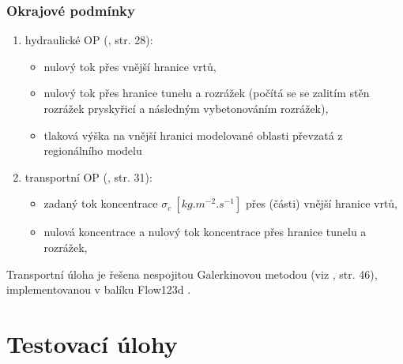 \documentclass[11pt,a4paper]{article}
\newcommand{\jb}[1]{{\color{violet} JB: #1}}
\begin{document}
\begin{onehalfspacing}

\subsubsection{Okrajové podmínky}
     \begin{enumerate}
        \item hydraulické OP (\cite{flow_pdf_manual}, str. 28):
            \begin{itemize}
                \item nulový tok přes vnější hranice vrtů,
                \item nulový tok přes hranice tunelu a rozrážek (počítá se se zalitím stěn rozrážek pryskyřicí a následným vybetonováním rozrážek),
                \item tlaková výška na vnější hranici modelované oblasti převzatá z regionálního modelu
            \end{itemize}
        \item transportní OP (\cite{flow_pdf_manual}, str. 31):
            \begin{itemize}
                \item zadaný tok koncentrace $\sigma_c~[kg.m^{-2}.s^{-1}]$ přes (části) vnější hranice vrtů,
                \item nulová koncentrace a nulový tok koncentrace přes hranice tunelu a rozrážek,
            \end{itemize}
     \end{enumerate}
     
Transportní úloha je řešena nespojitou Galerkinovou metodou (viz \cite{flow_pdf_manual}, str. 46), implementovanou v balíku Flow123d \cite{flow123d}.



\newpage
\section{Testovací úlohy}


\end{onehalfspacing}
\end{document}
